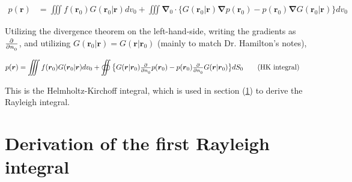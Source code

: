 \documentclass[12pt]{article}%
\begin{document}
\begin{align*}
    p(\boldsymbol r) &= \iiint f(\boldsymbol r_0) G(\boldsymbol r_0| \boldsymbol r) dv_0 +  \iiint \boldsymbol \nabla_0 \cdot \big\lbrace G(\boldsymbol r_0| \boldsymbol r) \boldsymbol\nabla p(\boldsymbol r_0) - p(\boldsymbol r_0) \boldsymbol\nabla  G(\boldsymbol r_0| \boldsymbol r)\big\rbrace dv_0
\end{align*}

\noindent Utilizing the divergence theorem on the left-hand-side, writing the gradients as $\pd{}{n_0}$, and utilizing $G(\boldsymbol r_0|\boldsymbol r) = G(\boldsymbol r|\boldsymbol r_0)$ (mainly to match Dr. Hamilton's notes), 

\begin{align*}
    p(\boldsymbol r) &= \iiint f(\boldsymbol r_0) G(\boldsymbol r_0| \boldsymbol r) dv_0 +  \oiint \big\lbrace G(\boldsymbol r| \boldsymbol r_0) \pd{}{n_0} p(\boldsymbol r_0) - p(\boldsymbol r_0) \pd{}{n_0}  G(\boldsymbol r| \boldsymbol r_0) \big\rbrace dS_0\tag{HK integral}
\end{align*}

\noindent This is the Helmholtz-Kirchoff integral, which is used in section (\ref{Rayleigh 1}) to derive the Rayleigh integral. 

\section{Derivation of the first Rayleigh integral}\label{Rayleigh 1}
\end{document}
